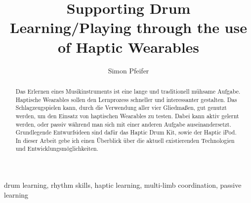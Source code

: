 \documentclass[ngerman,runningheads,a4paper]{llncs}
\begin{document}
\title{Supporting Drum Learning/Playing through the use of Haptic Wearables}
\author{Simon Pfeifer}
\maketitle

\begin{abstract}
Das Erlernen eines Musikinstruments ist eine lange und traditionell mühsame Aufgabe.
Haptische Wearables sollen den Lernprozess schneller und interessanter gestalten.
Das Schlagzeugspielen kann, durch die Verwendung aller vier Gliedmaßen, gut genutzt werden, um den Einsatz von haptischen Wearables zu testen.
Dabei kann aktiv gelernt werden, oder passiv während man sich mit einer anderen Aufgabe auseinandersetzt.
Grundlegende Entwurfsideen sind dafür das Haptic Drum Kit, sowie der Haptic iPod.
In dieser Arbeit gebe ich einen Überblick über die aktuell existierenden Technologien und Entwicklungsmöglichkeiten.
\end{abstract}

\begin{keywords}
drum learning, rhythm skills, haptic learning, multi-limb coordination, passive learning
\end{keywords}
\end{document}
